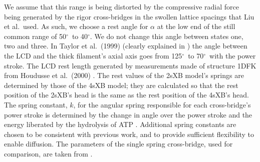 \documentclass[10pt]{article}
\newcommand{\citep}[1]{\cite{#1}} %
\newcommand{\de}{$^\circ$} %
\begin{document}
\begin{table}[ht]
\begin{center}
{	    We assume that this range is being distorted by the compressive radial force being generated by the rigor cross-bridges in the swollen lattice spacings that Liu et al.~used. 
	    As such, we choose a rest angle for $\alpha$ at the low end of the still common range of 50\de~to 40\de. 
	    We do not change this angle between states one, two and three.
	    In Taylor et al.~(1999) \citep{Taylor1999} (clearly explained in \citep{Davis2009}) the angle between the LCD and the thick filament's axial axis goes from 125\de~to 70\de~with the power stroke. 
	    The LCD rest length generated by measurements made of structure 1DFK from Houdusse et al.~(2000) \citep{Houdusse2000}. 
	    The rest values of the 2sXB model's springs are determined by those of the 4sXB model; they are calculated so that the rest position of the 2sXB's head is the same as the rest position of the 4sXB's head. 
	    The spring constant, $k$, for the angular spring responsible for each cross-bridge's power stroke is determined by the change in angle over the power stroke and the energy liberated by the hydrolysis of ATP \citep{Tanner2007}. 
	    Additional spring constants are chosen to be consistent with previous work, and to provide sufficient flexibility to enable diffusion. 
        The parameters of the single spring cross-bridge, used for comparison, are taken from \citep{Tanner2007}.
    }
    \end{center}
\end{table}

\end{document}
